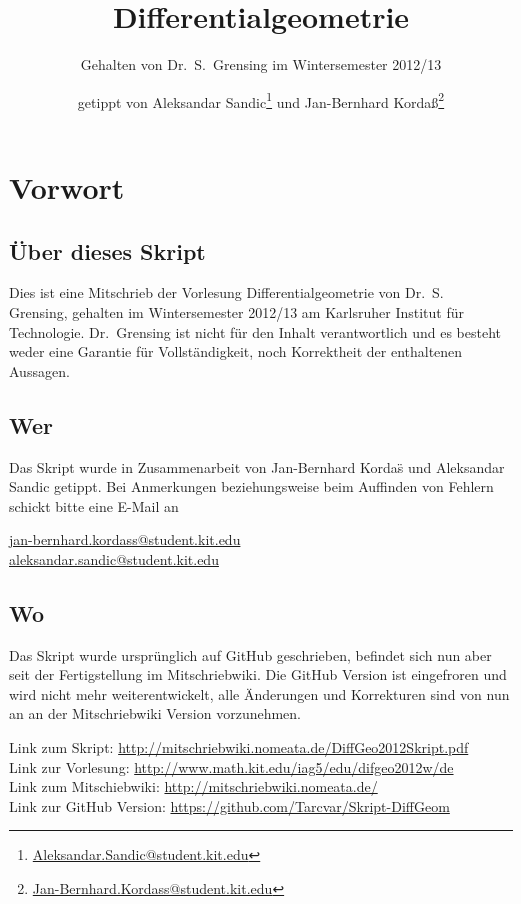 \documentclass[paper=A4, twoside, chapterprefix=true, bibliography=totoc, headsepline]{scrbook}
\title{Differentialgeometrie}
\subtitle{Gehalten von Dr.~S.~Grensing im Wintersemester 2012/13}
\author{getippt von Aleksandar Sandic\thanks{\href{mailto:aleksandar.sandic@student.kit.edu}{Aleksandar.Sandic@student.kit.edu}} und Jan-Bernhard Korda\ss\thanks{\href{mailto:jan-bernhard.kordass@student.kit.edu}{Jan-Bernhard.Kordass@student.kit.edu}}}
\theoremstyle{plain}
\theoremstyle{nonumberplain}
\theoremstyle{empty}
\theoremstyle{break}
\newcommand{\quot}[1]{\textrm{\glqq}{#1}\textrm{\grqq}}
\begin{document}
\maketitle

\setlength\parskip{0.6pt}
\tableofcontents

\chapter*{Vorwort}

\section*{\"Uber dieses Skript}
Dies ist eine Mitschrieb der Vorlesung \quot{Differentialgeometrie} von Dr.~S.~
Grensing, gehalten im Wintersemester 2012/13 am Karlsruher Institut f\"ur
Technologie.  Dr.~Grensing ist nicht f\"ur den Inhalt verantwortlich und es
besteht weder eine Garantie f\"ur Vollst\"andigkeit, noch Korrektheit der
enthaltenen Aussagen.

\section*{Wer}
Das Skript wurde in Zusammenarbeit von Jan-Bernhard Korda\"s und Aleksandar
Sandic getippt.  Bei Anmerkungen beziehungsweise beim Auffinden von Fehlern
schickt bitte eine E-Mail an
\begin{center}
  \href{mailto:jan-bernhard.kordass@student.kit.edu}{jan-bernhard.kordass@student.kit.edu}\\
  \href{mailto:aleksandar.sandic@student.kit.edu}{aleksandar.sandic@student.kit.edu}
\end{center}

\section*{Wo}
Das Skript wurde urspr\"unglich auf GitHub geschrieben, befindet sich nun aber
seit der Fertigstellung im Mitschriebwiki.  Die GitHub Version ist
\quot{eingefroren} und wird nicht mehr weiterentwickelt, alle \"Anderungen und
Korrekturen sind von nun an an der Mitschriebwiki Version vorzunehmen.

Link zum Skript: \url{http://mitschriebwiki.nomeata.de/DiffGeo2012Skript.pdf}\\
Link zur Vorlesung: \url{http://www.math.kit.edu/iag5/edu/difgeo2012w/de}\\
Link zum Mitschiebwiki: \url{http://mitschriebwiki.nomeata.de/}\\
Link zur GitHub Version: \url{https://github.com/Tarcvar/Skript-DiffGeom}
\end{document}
